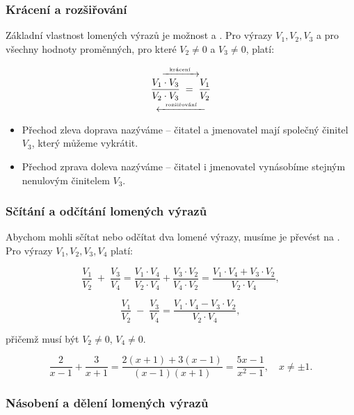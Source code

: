 \documentclass[12pt,a4paper]{article}
\begin{document}
\subsubsection*{Krácení a rozšiřování}

Základní vlastnost lomených výrazů je možnost  a .  
Pro výrazy $V_1, V_2, V_3$ a pro všechny hodnoty proměnných, pro které $V_2 \neq 0$ a $V_3 \neq 0$, platí:

\[
\overset{\xrightarrow{\ \large \text{krácení}\ }}%
{\underset{\xleftarrow{\ \large \text{rozšiřování}\ }}%
{\dfrac{V_1\cdot V_3}{V_2\cdot V_3} \;=\; \dfrac{V_1}{V_2}}}
\]


\begin{itemize}
    \item Přechod zleva doprava nazýváme  – čitatel a jmenovatel mají společný činitel $V_3$, který můžeme vykrátit.
    \item Přechod zprava doleva nazýváme  – čitatel i jmenovatel vynásobíme stejným nenulovým činitelem $V_3$.
\end{itemize}


\subsubsection*{Sčítání a odčítání lomených výrazů}

Abychom mohli sčítat nebo odčítat dva lomené výrazy, musíme je převést na .  
Pro výrazy $V_1, V_2, V_3, V_4$ platí:
\begin{definitionbox}
    \[
    \frac{V_1}{V_2} \;+\; \frac{V_3}{V_4}
    = \frac{V_1\cdot V_4}{V_2\cdot V_4} + \frac{V_3\cdot V_2}{V_4\cdot V_2}
    = \frac{V_1\cdot V_4 + V_3\cdot V_2}{V_2\cdot V_4},
    \]

    \[
    \frac{V_1}{V_2} \;-\; \frac{V_3}{V_4}
    = \frac{V_1\cdot V_4 - V_3\cdot V_2}{V_2\cdot V_4},
    \]

    přičemž musí být $V_2 \neq 0$, $V_4 \neq 0$.
\end{definitionbox}


\begin{examplebox}
\[
\frac{2}{x-1} + \frac{3}{x+1}
= \frac{2(x+1) + 3(x-1)}{(x-1)(x+1)}
= \frac{5x-1}{x^2-1}, \quad x \neq \pm 1.
\]
\end{examplebox}


\subsubsection*{Násobení a dělení lomených výrazů}
\end{document}
